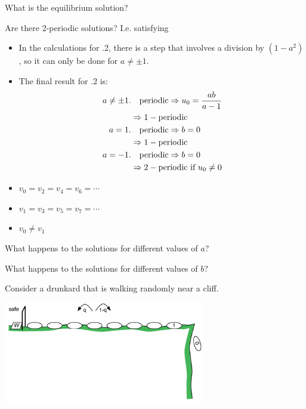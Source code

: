 	\begin{parts}
		\item What is the equilibrium solution?
		\item Are there 2-periodic solutions? I.e. satisfying
\begin{annotation}
	\begin{goals}
		\begin{itemize}
			\item In the calculations for .2, there is a step that involves a division by $(1-a^2)$, so it can only be done for $a \neq \pm 1$.
			\item The final result for .2 is:
			\begin{align*}
				a \neq \pm1. & \quad {\rm periodic} \Rightarrow u_0 = \frac{ab}{a-1}\\
							 & \Rightarrow  1-{\rm periodic} \\
				a = 1. 	& \quad {\rm periodic} \Rightarrow b=0  \\
						& \Rightarrow  1-{\rm periodic} \\
				a = -1. & \quad {\rm periodic} \Rightarrow b=0  \\
						& \Rightarrow  2-\text{periodic if } u_0\neq 0
			\end{align*}
		\end{itemize}
	\end{goals}
\end{annotation}
		\begin{itemize}
			\item $v_0=v_2=v_4=v_6=\cdots$
			\item $v_1=v_3=v_5=v_7=\cdots$
			\item $v_0\neq v_1$
		\end{itemize} 
		\item What happens to the solutions for different values of $a$?
		\item What happens to the solutions for different values of $b$?
	\end{parts}






\bookonlynewpage

\question \label{DE:drunkard}
	Consider a drunkard that is walking randomly near a cliff.

	\hfill \includegraphics*[width=250pt]{images/module26-drunk.pdf}
	\vspace{-70pt}

